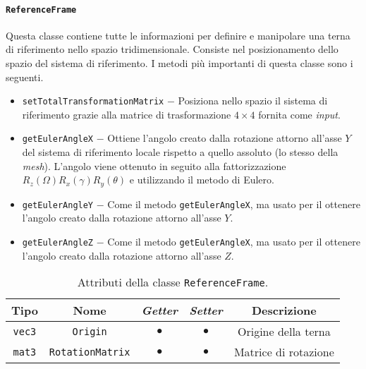 \paragraph{\texttt{ReferenceFrame}}
Questa classe contiene tutte le informazioni per definire e manipolare una terna di riferimento nello spazio tridimensionale. Consiste nel posizionamento dello spazio del sistema di riferimento. I metodi più importanti di questa classe sono i seguenti.
\begin{itemize}
	\item \texttt{setTotalTransformationMatrix} $-$ Posiziona nello spazio il sistema di riferimento grazie alla matrice di trasformazione $4\times4$ fornita come \textit{input}.
	\item \texttt{getEulerAngleX} $-$ Ottiene l'angolo creato dalla rotazione attorno all'asse $Y$ del sistema di riferimento locale rispetto a quello assoluto (lo stesso della \textit{mesh}). L'angolo viene ottenuto in seguito alla fattorizzazione $R_z(\Omega) R_x(\gamma) R_y(\theta)$ e utilizzando il metodo di Eulero.
	\item \texttt{getEulerAngleY} $-$ Come il metodo \texttt{getEulerAngleX}, ma usato per il ottenere l'angolo creato dalla rotazione attorno all'asse $Y$.
	\item \texttt{getEulerAngleZ} $-$ Come il metodo \texttt{getEulerAngleX}, ma usato per il ottenere l'angolo creato dalla rotazione attorno all'asse $Z$.
\end{itemize}
\begin{table}[h!]
	\centering
	\begin{tabular}{|c|c|c|c|c|}
		\hline 
		\textbf{Tipo} & \textbf{Nome} & \textit{\textbf{Getter}} & \textit{\textbf{Setter}} & \textbf{Descrizione} \\ \hline 
		\texttt{vec3} & \texttt{Origin} & $\bullet$ & $\bullet$ & Origine della terna \\ \hline 
		\texttt{mat3} & \texttt{RotationMatrix} & $\bullet$ & $\bullet$ & Matrice di rotazione \\ \hline
	\end{tabular}
	\caption{Attributi della classe \texttt{ReferenceFrame}.}
	\label{}
\end{table}
%
